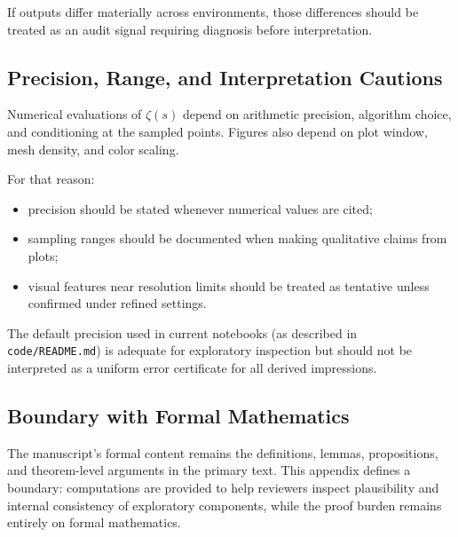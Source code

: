 If outputs differ materially across environments, those differences should be treated as an audit signal requiring diagnosis before interpretation.

\subsection{Precision, Range, and Interpretation Cautions}

Numerical evaluations of $\zeta(s)$ depend on arithmetic precision, algorithm choice, and conditioning at the sampled points. Figures also depend on plot window, mesh density, and color scaling.

For that reason:

\begin{itemize}
  \item precision should be stated whenever numerical values are cited;
  \item sampling ranges should be documented when making qualitative claims from plots;
  \item visual features near resolution limits should be treated as tentative unless confirmed under refined settings.
\end{itemize}

The default precision used in current notebooks (as described in \texttt{code/README.md}) is adequate for exploratory inspection but should not be interpreted as a uniform error certificate for all derived impressions.

\subsection{Boundary with Formal Mathematics}

The manuscript's formal content remains the definitions, lemmas, propositions, and theorem-level arguments in the primary text. This appendix defines a boundary: computations are provided to help reviewers inspect plausibility and internal consistency of exploratory components, while the proof burden remains entirely on formal mathematics.
